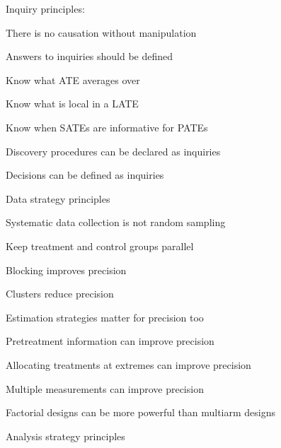 \documentclass[11pt]{article}
\begin{document}
\begin{legal}
\begin{legal}
	\item Inquiry principles:
		
		\begin{legal}
					
		\item	There is no causation without manipulation
		\item	Answers to inquiries should be defined 
		\item	Know what ATE averages over
		\item	Know what is local in a LATE 
		\item	Know when SATEs are informative for PATEs
		\item	Discovery procedures can be declared as inquiries
		\item	Decisions can be defined as inquiries 
		\end{legal}
				
		\item Data strategy principles 

		\begin{legal}				
		\item	Systematic data collection is not random sampling
		\item	Keep treatment and control groups parallel
		\item	Blocking improves precision
		\item	Clusters reduce  precision
		\item	Estimation strategies matter for precision too
		\item	Pretreatment information can improve precision
		\item	Allocating treatments at extremes can improve precision
		\item	Multiple measurements can improve precision
		\item	Factorial designs can be more powerful than multiarm designs
		\end{legal}
		
    \item Analysis strategy principles 
		

\end{legal}
\end{legal}
\end{document}
